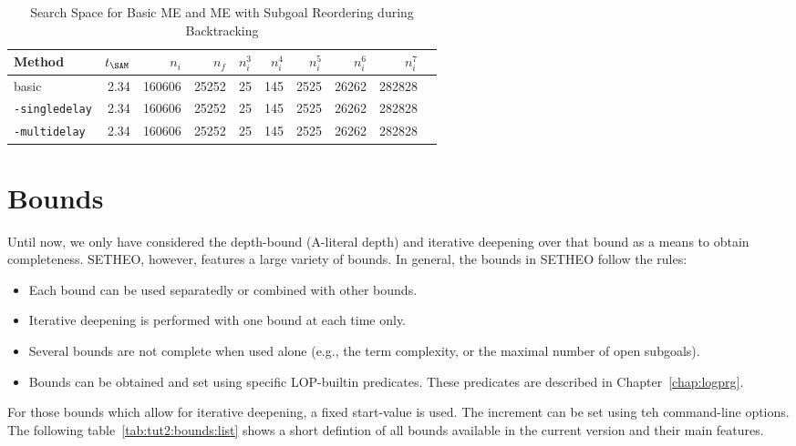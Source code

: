 \begin{table}[htb]
\begin{center}
\begin{tabular}{|l|r|r||r|r||r|r|r|r|r|}
\hline
Method & $t_{\SAM}$ & $n_i$ & $n_f$ & 
	$n_i^3$ & $n_i^4$ & $n_i^5$ & $n_i^6$ & $n_i^7$ \\
\hline\hline
basic & 2.34 & 160606 & 25252 &
	25 & 145 & 2525 & 26262 & 282828 \\
\hline
{\tt -singledelay} & 2.34 & 160606 & 25252 &
	25 & 145 & 2525 & 26262 & 282828 \\
\hline
{\tt -multidelay} & 2.34 & 160606 & 25252 &
	25 & 145 & 2525 & 26262 & 282828 \\
\hline\hline
\end{tabular}
\end{center}
\caption{Search Space for Basic ME and ME with Subgoal Reordering
	during Backtracking}  
\label{tab:tut2:results.delay}
\end{table}


\section{Bounds}
\label{sec:tut2:bounds}

Until now, we only have considered the depth-bound (A-literal depth)
and iterative deepening over that bound as a means to obtain completeness.
SETHEO, however, features a large variety of bounds.
In general, the bounds in SETHEO follow the rules:
\begin{itemize}
\item
Each bound can be used separatedly or combined with other bounds.
\item
Iterative deepening is performed with one bound at each time only.
\item
Several bounds are not complete when used alone (e.g., the term complexity,
or the maximal number of open subgoals).
\item
Bounds can be obtained and set using specific LOP-builtin predicates.
These predicates are described in Chapter~\ref{chap:logprg}.
\end{itemize}

For those bounds which allow for iterative deepening, a fixed start-value
is used. The increment can be set using teh command-line options.
The following table~\ref{tab:tut2:bounds:list} shows a short
defintion of all bounds available in the current version and their main
features.

